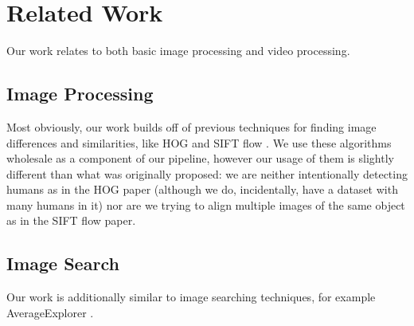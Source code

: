 
\section{Related Work}

Our work relates to both basic image processing and video processing.

\subsection{Image Processing}

Most obviously, our work builds off of previous techniques for finding image differences and similarities, like HOG \cite{HOG} and SIFT flow \cite{SIFTflow}.  We use these algorithms wholesale as a component of our pipeline, however our usage of them is slightly different than what was originally proposed: we are neither intentionally detecting humans as in the HOG paper (although we do, incidentally, have a dataset with many humans in it) nor are we trying to align multiple images of the same object as in the SIFT flow paper.

\subsection{Image Search}

Our work is additionally similar to image searching techniques, for example AverageExplorer \cite{averageExplorer}.